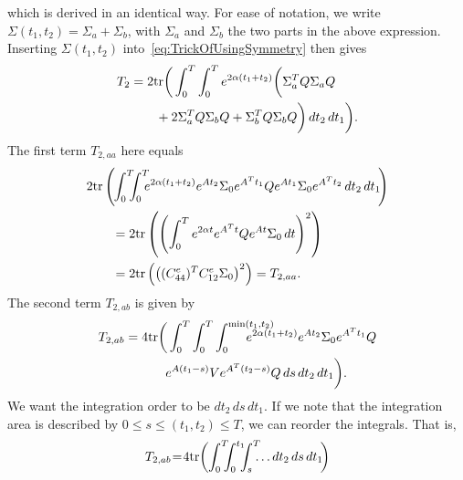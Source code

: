 \documentclass[twocolumn]{autart}
\begin{document}
\begin{pf}
\begin{equation}
\end{equation}
which is derived in an identical way. For ease of notation, we write $\Sigma(t_1,t_2) = \Sigma_a + \Sigma_b$, with $\Sigma_a$ and $\Sigma_b$ the two parts in the above expression. Inserting $\Sigma(t_1,t_2)$ into~\eqref{eq:TrickOfUsingSymmetry} then gives
\begin{align}
T_2 & = 2\mbox{tr}\bigg(\int_0^T \int_0^T e^{2\alpha(t_1+t_2)} \bigg(\Sigma_a^T Q \Sigma_a Q \nonumber \\
& \hspace{20pt} + 2\Sigma_a^T Q \Sigma_b Q + \Sigma_b^T Q \Sigma_b Q\bigg) \, dt_2 \, dt_1 \bigg).
\end{align}
The first term $T_{2,aa}$ here equals
\begin{align}
& 2\mbox{tr}\left(\hspace{-1pt}\int_0^T \hspace{-6pt} \int_0^T \hspace{-6pt} e^{2\alpha(t_1+t_2)} e^{A t_2} \Sigma_0 e^{A^T t_1} Q e^{A t_1} \Sigma_0 e^{A^T t_2} \, dt_2 \, dt_1\hspace{-2pt}\right) \nonumber \\
& \hspace{20pt} = 2\mbox{tr}\left(\left(\int_0^T e^{2\alpha t} e^{A^T t} Q e^{A t} \Sigma_0 \, dt\right)^2\right) \nonumber \\
& \hspace{20pt} = 2\mbox{tr}\left(\left((C_{44}^e)^T C_{12}^e \Sigma_0\right)^2\right) = T_{2,aa}.
\end{align}
The second term $T_{2,ab}$ is given by
\begin{align}
T_{2,ab} & = 4\tr\bigg(\int_0^T \int_0^T \int_0^{\min(t_1,t_2)} \hspace{-24pt} e^{2\alpha(t_1+t_2)} e^{A t_2} \Sigma_0 e^{A^T t_1} Q \nonumber \\
& \hspace{32pt} e^{A (t_1 - s)} V e^{A^T (t_2 - s)} Q \, ds \, dt_2 \, dt_1\bigg).
\end{align}
We want the integration order to be $dt_2 \, ds \, dt_1$. If we note that the integration area is described by $0 \leq s \leq (t_1,t_2) \leq T$, we can reorder the integrals. That is,
\begin{align}
T_{2,ab} & \hspace{-2pt}=\hspace{-2pt} 4\tr\bigg(\hspace{-2pt} \int_0^T \hspace{-6pt} \int_0^{t_1} \hspace{-6pt} \int_s^T \hspace{-6pt} \ldots dt_2 \, ds \, dt_1 \hspace{-2pt} \bigg) \\

\end{align}
\end{pf}
\end{document}
